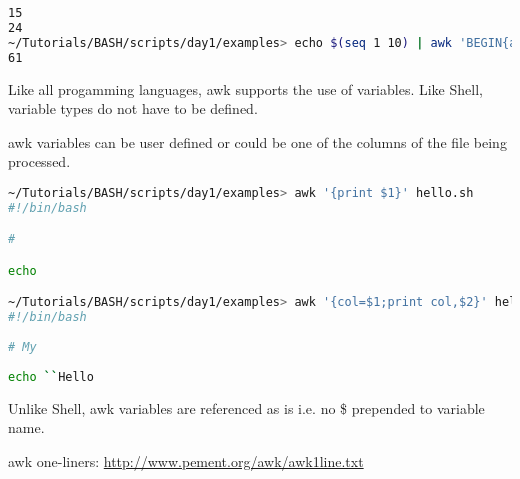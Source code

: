 \documentclass[slidestop,mathserif,compress,xcolor=svgnames]{beamer}
\begin{document}
\begin{frame}
\begin{itemize}
{\begin{lstlisting}[language=bash]
15
24
~/Tutorials/BASH/scripts/day1/examples> echo $(seq 1 10) | awk 'BEGIN{a=6}{for (i=1;i<=NF;i++){a+=$i}}END{print a}'                                                                                 
61
    \end{lstlisting}
    \item Like all progamming languages, awk supports the use of variables. Like Shell, variable types do not have to be defined.
    \item awk variables can be user defined or could be one of the columns of the file being processed.
    \begin{lstlisting}[language=bash]
~/Tutorials/BASH/scripts/day1/examples> awk '{print $1}' hello.sh 
#!/bin/bash

#

echo

~/Tutorials/BASH/scripts/day1/examples> awk '{col=$1;print col,$2}' hello.sh 
#!/bin/bash 
 
# My
 
echo ``Hello
    \end{lstlisting}
    \item Unlike Shell, awk variables are referenced as is i.e. no \$ prepended to variable name.
    \item awk one-liners: \url{http://www.pement.org/awk/awk1line.txt}
    }
  \end{itemize}
\end{frame}
\end{document}
